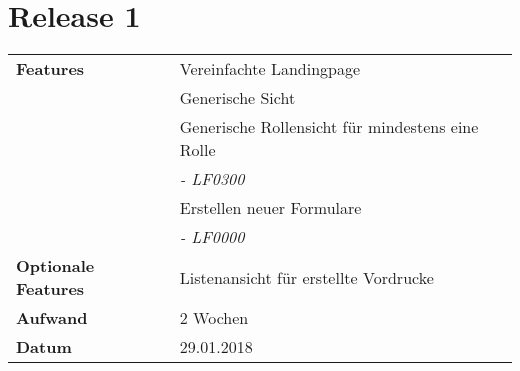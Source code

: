 \section*{Release 1 }
\label{sec:release_1}

\begin{tabular}{p{5cm}p{9cm}}
    \textbf{Features} & Vereinfachte Landingpage \\
    & Generische Sicht \\
    & Generische Rollensicht für mindestens eine Rolle \\
    & \hspace{8pt} \textit{\footnotesize - LF0300} \\
    &  Erstellen neuer Formulare \\
    & \hspace{8pt} \textit{\footnotesize - LF0000} \\
    \textbf{Optionale Features} & Listenansicht für erstellte Vordrucke \\
    \hline
    \textbf{Aufwand} & 2 Wochen \\
    \hline
    \textbf{Datum} & 29.01.2018
\end{tabular}